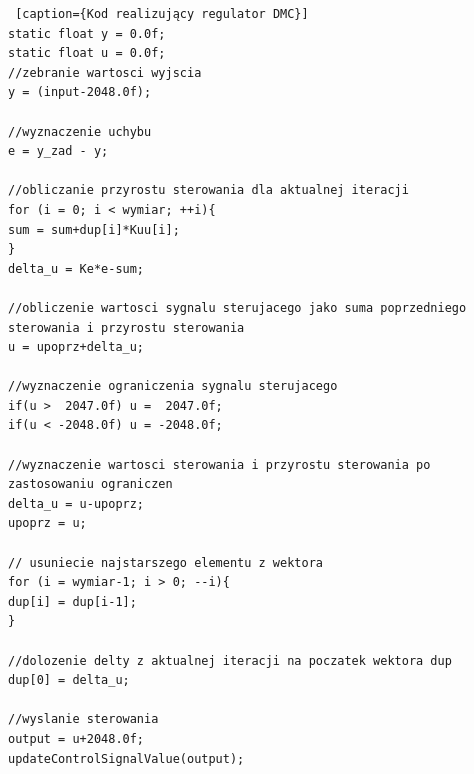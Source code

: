 \documentclass[a4paper, 10pt]{article}
\begin{document}
\begin{lstlisting} [caption={Kod realizujący regulator DMC}]
static float y = 0.0f;
static float u = 0.0f;
//zebranie wartosci wyjscia
y = (input-2048.0f);

//wyznaczenie uchybu
e = y_zad - y; 

//obliczanie przyrostu sterowania dla aktualnej iteracji
for (i = 0; i < wymiar; ++i){
sum = sum+dup[i]*Kuu[i];
}
delta_u = Ke*e-sum;

//obliczenie wartosci sygnalu sterujacego jako suma poprzedniego sterowania i przyrostu sterowania
u = upoprz+delta_u;

//wyznaczenie ograniczenia sygnalu sterujacego
if(u >  2047.0f) u =  2047.0f;
if(u < -2048.0f) u = -2048.0f;

//wyznaczenie wartosci sterowania i przyrostu sterowania po zastosowaniu ograniczen
delta_u = u-upoprz;
upoprz = u;

// usuniecie najstarszego elementu z wektora
for (i = wymiar-1; i > 0; --i){
dup[i] = dup[i-1];
}

//dolozenie delty z aktualnej iteracji na poczatek wektora dup
dup[0] = delta_u; 

//wyslanie sterowania
output = u+2048.0f; 
updateControlSignalValue(output);
\end{lstlisting}
\end{document}
